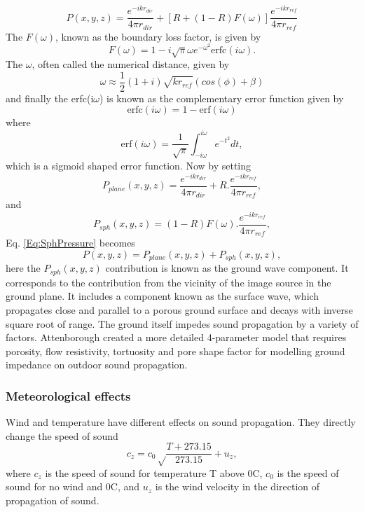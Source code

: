 \begin{equation}
    P(x,y,z)=\frac{e^{-ikr_{dir}}}{4\pi r_{dir}} + [R + (1-R)F(\omega)]\frac{e^{-ikr_{ref}}}{4\pi r_{ref}}
    \label{Eq:SphPressure}
\end{equation}
The $F(\omega)$, known as the boundary loss factor, is given by
\begin{equation}
    F(\omega)=1-i\sqrt{\pi}\omega e^{-\omega^2}\text{erfc}(i\omega).
\end{equation}
The $\omega$, often called the numerical distance, given by
\begin{equation}
    \omega \approx \frac{1}{2}(1+i)\sqrt{kr_{ref}}(cos(\phi)+\beta)
\end{equation}
and finally the erfc(i$\omega$) is known as the complementary error function given by 
\begin{equation}
    \text{erfc}(i\omega) = 1-\text{erf}(i\omega)
\end{equation}
where
\begin{equation}
    \text{erf}(i\omega)=\frac{1}{\sqrt\pi}\int_{-i\omega}^{i\omega}e^{-t^2}dt,
\end{equation}
which is a sigmoid shaped error function. Now by setting
\begin{equation}
    P_{plane}(x,y,z)=\frac{e^{-ikr_{dir}}}{4\pi r_{dir}} + R.\frac{e^{-ikr_{ref}}}{4\pi r_{ref}},
\end{equation}
and 
\begin{equation}
    P_{sph}(x,y,z)=(1-R)F(\omega).\frac{e^{-ikr_{ref}}}{4\pi r_{ref}},
\end{equation}
Eq. \ref{Eq:SphPressure} becomes
\begin{equation}
    P(x,y,z)=P_{plane}(x,y,z) + P_{sph}(x,y,z),
    \label{Eq:GroundWave}
\end{equation}
here the $P_{sph}(x,y,z)$ contribution is known as the ground wave component. It corresponds to the contribution from the vicinity of the image source in the ground plane. It includes a component known as the surface wave, which propagates close and parallel to a porous ground surface and decays with inverse square root of range.
The ground itself impedes sound propagation by a variety of factors. Attenborough \cite{attenborough2011outdoor} created a more detailed 4-parameter model that requires porosity, flow resistivity, tortuosity and pore shape factor for modelling ground impedance on outdoor sound propagation. 

\subsubsection{Meteorological effects}
Wind and temperature have different effects on sound propagation. They directly change the speed of sound
\begin{equation}
    c_z = c_0\sqrt\frac{T+273.15}{273.15} + u_z,
\end{equation}
where $c_z$ is the speed of sound for temperature T above 0\degree C, $c_0$ is the speed of sound for no wind and 0\degree C, and $u_z$ is the wind velocity in the direction of propagation of sound. 

